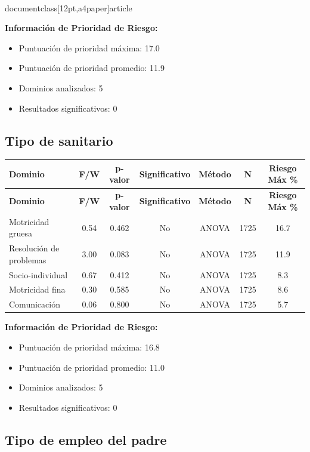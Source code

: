 \\documentclass[12pt,a4paper]{article}
\begin{document}
\textbf{Información de Prioridad de Riesgo:}
\begin{itemize}
\item Puntuación de prioridad máxima: 17.0
\item Puntuación de prioridad promedio: 11.9
\item Dominios analizados: 5
\item Resultados significativos: 0
\end{itemize}


\subsection{Tipo de sanitario}


\begin{longtable}{|l|c|c|c|c|c|c|}
\hline
\textbf{Dominio} & \textbf{F/W} & \textbf{p-valor} & \textbf{Significativo} & \textbf{Método} & \textbf{N} & \textbf{Riesgo Máx \%} \\
\hline
\endfirsthead

\hline
\textbf{Dominio} & \textbf{F/W} & \textbf{p-valor} & \textbf{Significativo} & \textbf{Método} & \textbf{N} & \textbf{Riesgo Máx \%} \\
\hline
\endhead

\hline
\endfoot

\hline
\endlastfoot

Motricidad gruesa & 0.54 & 0.462 & No & ANOVA & 1725 & 16.7 \\
Resolución de problemas & 3.00 & 0.083 & No & ANOVA & 1725 & 11.9 \\
Socio-individual & 0.67 & 0.412 & No & ANOVA & 1725 & 8.3 \\
Motricidad fina & 0.30 & 0.585 & No & ANOVA & 1725 & 8.6 \\
Comunicación & 0.06 & 0.800 & No & ANOVA & 1725 & 5.7 \\

\end{longtable}


\textbf{Información de Prioridad de Riesgo:}
\begin{itemize}
\item Puntuación de prioridad máxima: 16.8
\item Puntuación de prioridad promedio: 11.0
\item Dominios analizados: 5
\item Resultados significativos: 0
\end{itemize}


\subsection{Tipo de empleo del padre}
\end{document}
